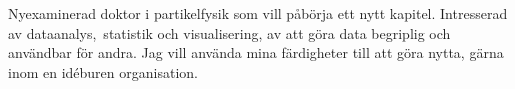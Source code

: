 

\begin{cvparagraph}

Nyexaminerad doktor i partikelfysik som vill p{\aa}b{\"o}rja ett nytt kapitel. %
Intresserad av dataanalys, statistik och visualisering, av att g{\"o}ra data begriplig och anv{\"a}ndbar f{\"o}r andra.
Jag vill anv{\"a}nda mina f{\"a}rdigheter till att g{\"o}ra nytta, g{\"a}rna inom en id\'eburen organisation.
\end{cvparagraph}